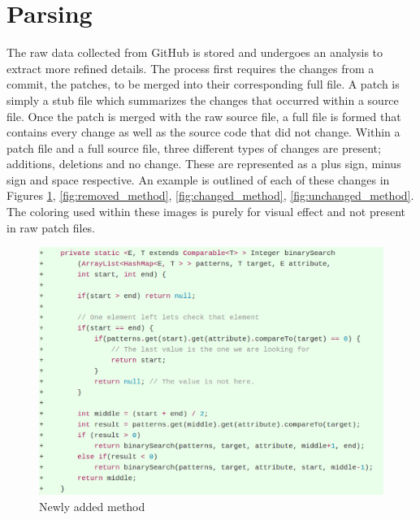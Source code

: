\section{Parsing}
\label{sec:parsing}

The raw data collected from GitHub is stored and undergoes an analysis to extract more refined details. The process first requires the changes from a commit, the patches, to be merged into their corresponding full file. A patch is simply a stub file which summarizes the changes that occurred within a source file. Once the patch is merged with the raw source file, a full file is formed that contains every change as well as the source code that did not change. Within a patch file and a full source file, three different types of changes are present; additions, deletions and no change. These are represented as a plus sign, minus sign and space respective. An example is outlined of each of these changes in Figures \ref{fig:added_method}, \ref{fig:removed_method}, \ref{fig:changed_method}, \ref{fig:unchanged_method}. The coloring used within these images is purely for visual effect and not present in raw patch files.

\begin{figure}[!ht]
    \centering
        \includegraphics[width=1.0\textwidth]{images/added_example}
    \caption{Newly added method}
    \label{fig:added_method}
\end{figure}

